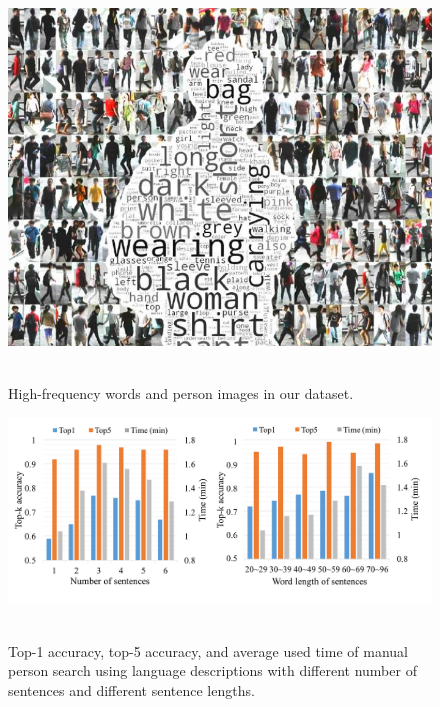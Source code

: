 \begin{figure}
\begin{center}
\includegraphics[width=0.8\linewidth]{figures/person_nlp/wordcloud.pdf} \ \\
\end{center}
\vspace{-7pt}
\caption{High-frequency words and person images in our dataset.}
\label{fig:wordcould}
\vspace{-7pt}
\end{figure}
\begin{figure}
\begin{center}
\includegraphics[width=1\linewidth]{figures/person_nlp/sentnumleng.pdf} \ \\
\end{center}
\vspace{-9pt}
   \caption{Top-1 accuracy, top-5 accuracy, and average used time of manual person search using language descriptions with different number of sentences and different sentence lengths.}
\label{fig:sentnumberlength}
\end{figure}


